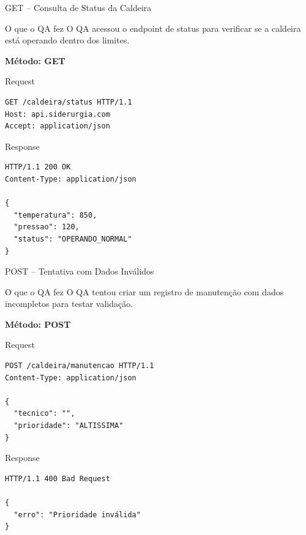 \documentclass[9pt]{beamer}
\begin{document}
\begin{frame}[fragile]{GET – Consulta de Status da Caldeira}

\begin{block}{O que o QA fez}
O QA acessou o endpoint de status para verificar se a caldeira
está operando dentro dos limites.
\end{block}

\textbf{Método: GET}

\begin{block}{Request}
\begin{verbatim}
GET /caldeira/status HTTP/1.1
Host: api.siderurgia.com
Accept: application/json
\end{verbatim}
\end{block}

\begin{block}{Response}
\begin{verbatim}
HTTP/1.1 200 OK
Content-Type: application/json

{
  "temperatura": 850,
  "pressao": 120,
  "status": "OPERANDO_NORMAL"
}
\end{verbatim}
\end{block}

\end{frame}  
\begin{frame}[fragile]{POST – Tentativa com Dados Inválidos}

\begin{block}{O que o QA fez}
O QA tentou criar um registro de manutenção
com dados incompletos para testar validação.
\end{block}

\textbf{Método: POST}

\begin{block}{Request}
\begin{verbatim}
POST /caldeira/manutencao HTTP/1.1
Content-Type: application/json

{
  "tecnico": "",
  "prioridade": "ALTISSIMA"
}
\end{verbatim}
\end{block}

\begin{block}{Response}
\begin{verbatim}
HTTP/1.1 400 Bad Request

{
  "erro": "Prioridade inválida"
}
\end{verbatim}
\end{block}

\end{frame}
\end{document}
